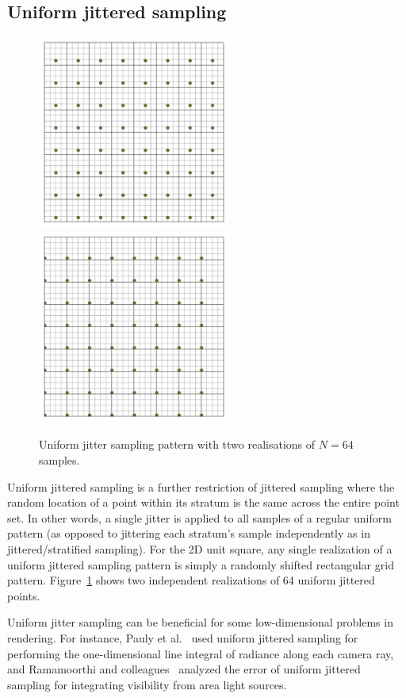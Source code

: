 \documentclass[11pt,fleqn]{book} %
\begin{document}
\subsection{Uniform jittered sampling}
%
\begin{figure}[ht]
  \centering
  \includegraphics[width=2.5in]{Pictures/pointset-gridvisualize/points-uniformjitter-n64-1.pdf}
    \includegraphics[width=2.5in]{./Pictures/pointset-gridvisualize/points-uniformjitter-n64.pdf}
  \caption{Uniform jitter sampling pattern with ttwo realisations of $N=64$ samples.}
  \label{fig:uniformjitter}
\end{figure}
%
Uniform jittered sampling is a further restriction of jittered sampling where the random location of a point within its stratum is the same across the entire point set. In other words, a single jitter is applied to all samples of a regular uniform pattern (as opposed to jittering each stratum's sample independently as in jittered/stratified sampling). For the 2D unit square, any single realization of a uniform jittered sampling pattern is simply a randomly shifted rectangular grid pattern. Figure~\ref{fig:uniformjitter} shows two independent realizations of 64 uniform jittered points.

Uniform jitter sampling can be beneficial for some low-dimensional problems in rendering. For instance, Pauly et al.~\cite{pauly00metropolis} used uniform jittered sampling for performing the one-dimensional line integral of radiance along each camera ray, and Ramamoorthi and colleagues~\cite{Ramamoorthi:2012} analyzed the error of uniform jittered sampling for integrating visibility from area light sources.
\end{document}
